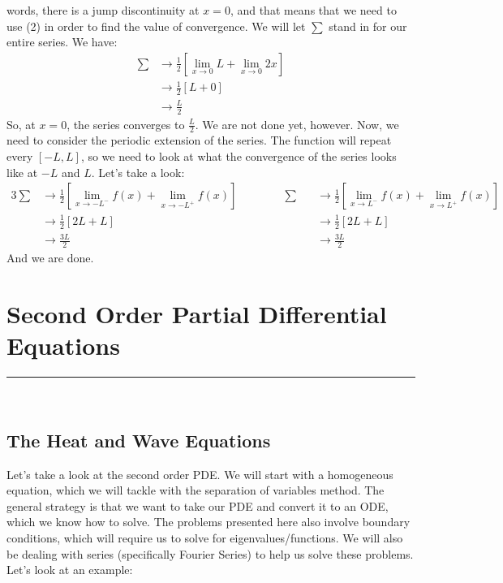 \documentclass{article}
\begin{document}
words, there is a jump discontinuity at $x = 0$, and that means that we need to
use (2) in order to find the value of convergence. We will let $\sum$ stand in
for our entire series. We have:
\begin{align*}
\sum &\to \frac{1}{2}\left[\lim_{x\to 0}L + \lim_{x\to0}2x\right]\\
&\to \frac{1}{2}[L + 0]\\
&\to \frac{L}{2}
\end{align*}
\noindent So, at $x=0$, the series converges to $\frac{L}{2}$. We are not done
yet, however. Now, we need to consider the periodic extension of the series. The
function will repeat every $[-L,L]$, so we need to look at what the convergence
of the series looks like at $-L$ and $L$. Let's take a look:
\begin{alignat*}{3}
\sum&\to\frac{1}{2}\left[\lim_{x\to-L^{-}}f(x) + \lim_{x\to-L^{+}}f(x)\right] \qquad\qquad \sum&&\to
\frac{1}{2}\left[\lim_{x\to L^{-}}f(x) + \lim_{x\to L^{+}}f(x)\right]\\
&\to \frac{1}{2}[2L + L] &&\to \frac{1}{2}[2L + L]\\
&\to\frac{3L}{2} &&\to\frac{3L}{2}
\end{alignat*}
\noindent And we are done.
\newpage



\section{Second Order Partial Differential Equations}
\hrule
\noindent\\
\subsection{The Heat and Wave Equations}
\indent Let's take a look at the second order PDE. We will start with a
homogeneous equation, which we will tackle with the separation of variables
method. The general strategy is that we want to take our PDE and convert it to
an ODE, which we know how to solve. The problems presented here also involve
boundary conditions, which will require us to solve for eigenvalues/functions.
We will also be dealing with series (specifically Fourier Series) to help us
solve these problems. Let's look at an example:\\
\end{document}
